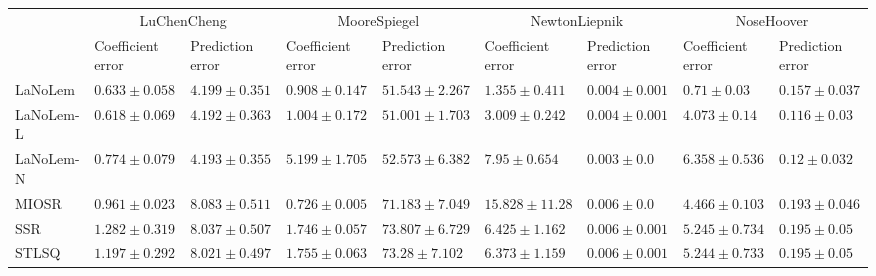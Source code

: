 \begin{table*}
{\begin{tabular}{lllllllll}
 & \multicolumn{2}{c}{LuChenCheng} & \multicolumn{2}{c}{MooreSpiegel} & \multicolumn{2}{c}{NewtonLiepnik} & \multicolumn{2}{c}{NoseHoover} \\
 & Coefficient error & Prediction error & Coefficient error & Prediction error & Coefficient error & Prediction error & Coefficient error & Prediction error \\
\midrule
LaNoLem & $0.633\pm 0.058$ & $4.199\pm 0.351$ & $0.908\pm 0.147$ & $51.543\pm 2.267$ & $\mathbf{1.355}\pm 0.411$ & $0.004\pm 0.001$ & $\mathbf{0.71}\pm 0.03$ & $0.157\pm 0.037$ \\
LaNoLem-L & $\mathbf{0.618}\pm 0.069$ & $\mathbf{4.192}\pm 0.363$ & $1.004\pm 0.172$ & $\mathbf{51.001}\pm 1.703$ & $3.009\pm 0.242$ & $0.004\pm 0.001$ & $4.073\pm 0.14$ & $\mathbf{0.116}\pm 0.03$ \\
LaNoLem-N & $0.774\pm 0.079$ & $4.193\pm 0.355$ & $5.199\pm 1.705$ & $52.573\pm 6.382$ & $7.95\pm 0.654$ & $\mathbf{0.003}\pm 0.0$ & $6.358\pm 0.536$ & $0.12\pm 0.032$ \\
MIOSR & $0.961\pm 0.023$ & $8.083\pm 0.511$ & $\mathbf{0.726}\pm 0.005$ & $71.183\pm 7.049$ & $15.828\pm 11.28$ & $0.006\pm 0.0$ & $4.466\pm 0.103$ & $0.193\pm 0.046$ \\
SSR & $1.282\pm 0.319$ & $8.037\pm 0.507$ & $1.746\pm 0.057$ & $73.807\pm 6.729$ & $6.425\pm 1.162$ & $0.006\pm 0.001$ & $5.245\pm 0.734$ & $0.195\pm 0.05$ \\
STLSQ & $1.197\pm 0.292$ & $8.021\pm 0.497$ & $1.755\pm 0.063$ & $73.28\pm 7.102$ & $6.373\pm 1.159$ & $0.006\pm 0.001$ & $5.244\pm 0.733$ & $0.195\pm 0.05$ \\

\bottomrule
\end{tabular}
}
\end{table*}
